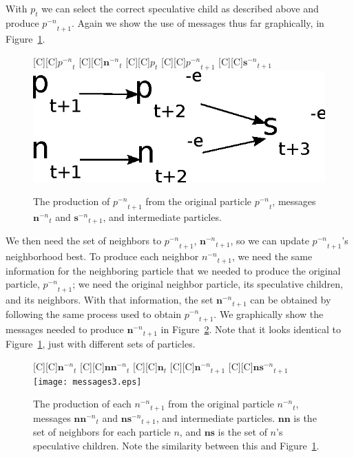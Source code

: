 \documentclass[oneside,honors]{honors}
\newcommand{\fig}[1]{Figure~\ref{fig:#1}}
\providecommand{\nonbest}[1]{\ensuremath{#1^{-n}}}
\providecommand{\p}{\ensuremath{p}}
\providecommand{\sset}{\ensuremath{\mathbf{s}}}
\providecommand{\nsset}{\ensuremath{\mathbf{ns}}}
\providecommand{\n}{\ensuremath{n}}
\providecommand{\nset}{\ensuremath{\mathbf{n}}}
\providecommand{\nnset}{\ensuremath{\mathbf{nn}}}
\begin{document}
With $\p_t$ we can select the correct speculative child as described above and
produce $\nonbest{\p}_{t+1}$.  Again we show the use of messages thus far
graphically, in \fig{messages2}.  

\begin{figure}
  \centering
  [C][C]{$\nonbest{\p}_{t}$}
  [C][C]{$\nonbest{\nset}_{t}$}
  [C][C]{$\p_{t}$}
  [C][C]{$\nonbest{\p}_{t+1}$}
  [C][C]{$\nonbest{\sset}_{t+1}$}
  \includegraphics[width=.5\columnwidth]{messages2.eps}
  \caption{The production of $\nonbest{\p}_{t+1}$ from the original particle 
  $\nonbest{\p}_{t}$, messages $\nonbest{\nset}_{t}$ and
  $\nonbest{\sset}_{t+1}$, and intermediate particles.}
  \label{fig:messages2}
\end{figure}

We then need the set of neighbors to $\nonbest{\p}_{t+1}$,
$\nonbest{\nset}_{t+1}$, so we can update $\nonbest{\p}_{t+1}$'s neighborhood
best.  To produce each neighbor $\nonbest{\n}_{t+1}$, we need the same
information for the neighboring particle that we needed to produce the original
particle, $\nonbest{\p}_{t+1}$; we need the original neighbor particle, its
speculative children, and its neighbors.  With that information, the set
$\nonbest{\nset}_{t+1}$ can be obtained by following the same process used to
obtain $\nonbest{\p}_{t+1}$.  We graphically show the messages needed to
produce $\nonbest{\nset}_{t+1}$ in \fig{messages3}.  Note that it looks
identical to \fig{messages2}, just with different sets of particles.

\begin{figure}
  \centering
  [C][C]{$\nonbest{\nset}_{t}$}
  [C][C]{$\nonbest{\nnset}_{t}$}
  [C][C]{$\nset_{t}$}
  [C][C]{$\nonbest{\nset}_{t+1}$}
  [C][C]{$\nonbest{\nsset}_{t+1}$}
  \texttt{[image: messages3.eps]}
  \caption{The production of each $\nonbest{\n}_{t+1}$ from the original
  particle $\nonbest{\n}_{t}$, messages $\nonbest{\nnset}_{t}$ and
  $\nonbest{\nsset}_{t+1}$, and intermediate particles.  $\nnset$ is the set of
  neighbors for each particle $\n$, and $\nsset$ is the set of $\n$'s
  speculative children.  Note the similarity between this and \fig{messages2}.}
  \label{fig:messages3}
\end{figure}
\end{document}
